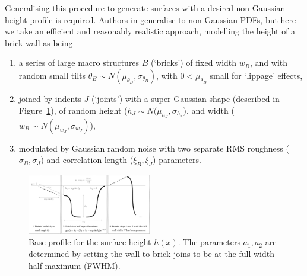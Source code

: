 \documentclass[lettersize,journal]{IEEEtran}
\begin{document}
Generalising this procedure to generate surfaces with a desired non-Gaussian height
profile is required. Authors in \cite{ref:nonGaussianGeneration} generalise to
non-Gaussian PDFs, but here we take an efficient and reasonably realistic approach,
modelling the height of a brick wall as being
\begin{enumerate}
   \item a series of large macro structures $B$ (`bricks') of fixed width $w_B$, and
      with random small tilts $\theta_B \sim N(\mu_{\theta_B}, \sigma_{\theta_B})$,
      with $0 < \mu_{\theta_B}$ small for `lippage' effects,
   \item joined by indents $J$ (`joints') with a super-Gaussian shape (described in
      Figure~\ref{fig:wall-structure}), of random height ($h_J \sim N(\mu_{h_J},
      \sigma_{h_J}$), and width ($w_B \sim N(\mu_{w_J}, \sigma_{w_J})$),
   \item modulated by Gaussian random noise with two separate RMS roughness
      ($\sigma_B, \sigma_J$) and correlation length ($\xi_B, \xi_J$) parameters.
\end{enumerate}
\begin{figure}[!b]
   \begin{center}
      \includegraphics[width=0.48\textwidth]{../figures/wall-structure-crop.pdf}
   \end{center}
   \caption{Base profile for the surface height $h(x)$. The parameters $a_1, a_2$ are
   determined by setting the wall to brick joins to be at the full-width half maximum
   (FWHM).}\label{fig:wall-structure}
\end{figure}
\end{document}
